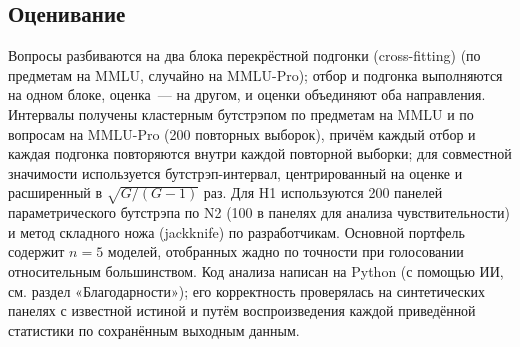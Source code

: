 \documentclass[preprint,12pt,authoryear]{elsarticle}
\begin{document}
\begin{table}[!htbp]
\centering
\caption{Источники данных.}
\label{tab:data}
\small
{}
\end{table}

\subsection{Оценивание}
Вопросы разбиваются на два блока перекрёстной подгонки (cross-fitting) (по предметам на MMLU, случайно на MMLU-Pro); отбор и подгонка выполняются на одном блоке, оценка~--- на другом, и оценки объединяют оба направления. Интервалы получены кластерным бутстрэпом по предметам на MMLU и по вопросам на MMLU-Pro (200 повторных выборок), причём каждый отбор и каждая подгонка повторяются внутри каждой повторной выборки; для совместной значимости используется бутстрэп-интервал, центрированный на оценке и расширенный в $\sqrt{G/(G-1)}$ раз. Для H1 используются 200 панелей параметрического бутстрэпа по N2 (100 в панелях для анализа чувствительности) и метод складного ножа (jackknife) по разработчикам. Основной портфель содержит $n=5$ моделей, отобранных жадно по точности при голосовании относительным большинством. Код анализа написан на Python (с помощью ИИ, см. раздел «Благодарности»); его корректность проверялась на синтетических панелях с известной истиной и путём воспроизведения каждой приведённой статистики по сохранённым выходным данным.
\end{document}

